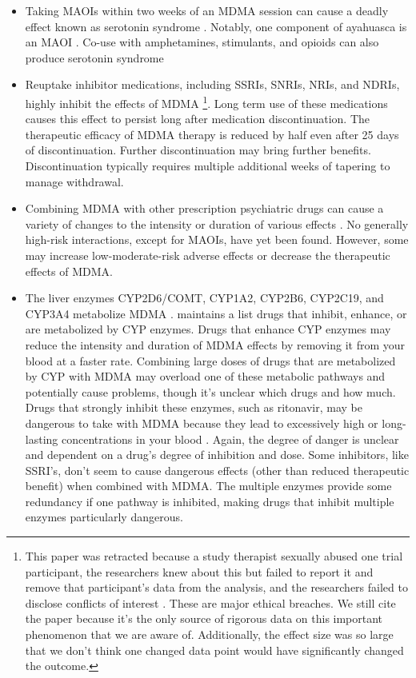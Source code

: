 \documentclass[12pt,letterpaper]{book}
\begin{document}
\begin{itemize}
    \item Taking MAOIs within two weeks of an MDMA session can cause a deadly effect known as serotonin syndrome \cite{malcolmSerotonin,edinoffInteractions}. Notably, one component of ayahuasca is an MAOI \cite{ruffell2020pharmacological}. Co-use with amphetamines, stimulants, and opioids can also produce serotonin syndrome \cite{makunts2022reported}
    \item Reuptake inhibitor medications, including SSRIs, SNRIs, NRIs, and NDRIs, highly inhibit the effects of MDMA \cite{feducciaSSRIDiscontinuation} \footnote{\label{ssriRetraction}This paper was retracted because a study therapist sexually abused one trial participant, the researchers knew about this but failed to report it and remove that participant's data from the analysis, and the researchers failed to disclose conflicts of interest \cite{feduccia2024retraction,nytimesRetraction}. These are major ethical breaches. We still cite the paper because it's the only source of rigorous data on this important phenomenon that we are aware of. Additionally, the effect size was so large that we don't think one changed data point would have significantly changed the outcome.}. Long term use of these medications causes this effect to persist long after medication discontinuation. The therapeutic efficacy of MDMA therapy is reduced by half even after 25 days of discontinuation. Further discontinuation may bring further benefits. Discontinuation typically requires multiple additional weeks of tapering to manage withdrawal.
    \item Combining MDMA with other prescription psychiatric drugs can cause a variety of changes to the intensity or duration of various effects \cite{sarparastDrugInteractions}. No generally high-risk interactions, except for MAOIs, have yet been found. However, some may increase low-moderate-risk adverse effects or decrease the therapeutic effects of MDMA.
    \item The liver enzymes CYP2D6/COMT, CYP1A2, CYP2B6, CYP2C19, and CYP3A4 metabolize MDMA \cite{torreEnzymes,sarparastDrugInteractions}. \textcite{flockartTable} maintains a list drugs that inhibit, enhance, or are metabolized by CYP enzymes. Drugs that enhance CYP enzymes may reduce the intensity and duration of MDMA effects by removing it from your blood at a faster rate. Combining large doses of drugs that are metabolized by CYP with MDMA may overload one of these metabolic pathways and potentially cause problems, though it's unclear which drugs and how much. Drugs that strongly inhibit these enzymes, such as ritonavir, may be dangerous to take with MDMA because they lead to excessively high or long-lasting concentrations in your blood \cite{sarparastDrugInteractions}. Again, the degree of danger is unclear and dependent on a drug's degree of inhibition and dose. Some inhibitors, like SSRI's, don't seem to cause dangerous effects (other than reduced therapeutic benefit) when combined with MDMA. The multiple enzymes provide some redundancy if one pathway is inhibited, making drugs that inhibit multiple enzymes particularly dangerous.

\end{itemize}
\end{document}
